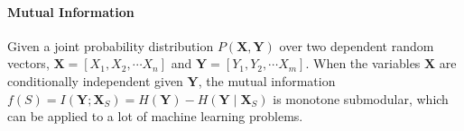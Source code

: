\documentclass[12pt]{article}
\begin{document}
\paragraph{\textbf{Mutual Information}} 

Given a joint probability distribution $ P(\textbf{X}, \textbf{Y}) $ over two dependent random vectors, $ \textbf{X} = [ X_{1}, X_{2}, \cdots X_{n} ] $ and  $ \textbf{Y} = [ Y_{1}, Y_{2}, \cdots X_{m} ] $. When the variables $ \textbf{X} $  are conditionally independent given $ \textbf{Y} $, the mutual information $ f(S) = I(\textbf{Y}; {\textbf{X}}_{S} ) = H(\textbf{Y}) - H(\textbf{Y} \mid {\textbf{X}}_{S}) $ is monotone submodular, which can be applied to a lot of machine learning problems.  



\end{document}
